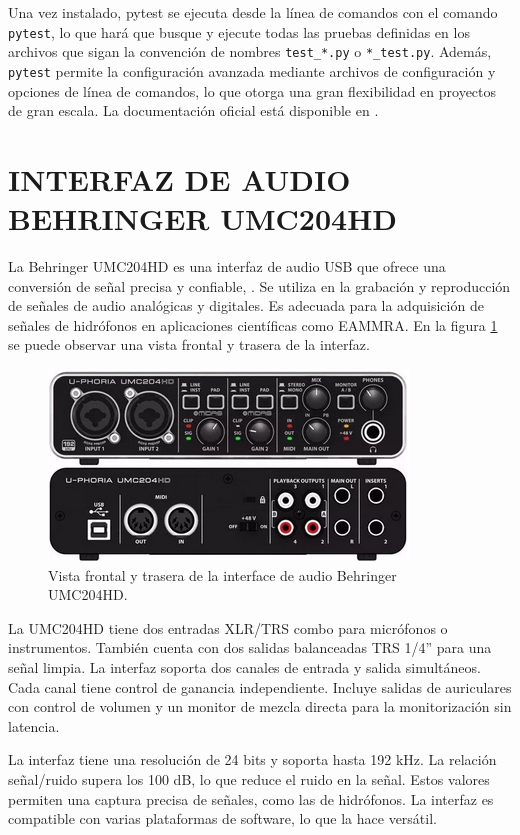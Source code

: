 Una vez instalado, pytest se ejecuta desde la línea de comandos con el comando \texttt{pytest}, lo que hará que busque y ejecute todas las pruebas definidas en los archivos que sigan la convención de nombres \texttt{test\_*.py} o \texttt{*\_test.py}. Además, \texttt{pytest} permite la configuración avanzada mediante archivos de configuración y opciones de línea de comandos, lo que otorga una gran flexibilidad en proyectos de gran escala. La documentación oficial está disponible en \citep{pytest_documentation}.

\clearpage
\section{INTERFAZ DE AUDIO BEHRINGER UMC204HD}

La Behringer UMC204HD es una interfaz de audio USB que ofrece una conversión de señal precisa y confiable, \citep{behringerUMC204HD}. Se utiliza en la grabación y reproducción de señales de audio analógicas y digitales. Es adecuada para la adquisición de señales de hidrófonos en aplicaciones científicas como EAMMRA. En la figura \ref{fig:behringer} se puede observar una vista frontal y trasera de la interfaz.

\vspace{10px}
\begin{figure}[ht]
    \centering
    \includegraphics[width=.5\textwidth]{graficos/behringer.png}
    \caption[]{Vista frontal y trasera de la interface de audio Behringer UMC204HD.}
    \label{fig:behringer}
\end{figure}

La UMC204HD tiene dos entradas XLR/TRS combo para micrófonos o instrumentos. También cuenta con dos salidas balanceadas TRS 1/4” para una señal limpia. La interfaz soporta dos canales de entrada y salida simultáneos. Cada canal tiene control de ganancia independiente. Incluye salidas de auriculares con control de volumen y un monitor de mezcla directa para la monitorización sin latencia.

La interfaz tiene una resolución de 24 bits y soporta hasta 192 kHz. La relación señal/ruido supera los 100 dB, lo que reduce el ruido en la señal. Estos valores permiten una captura precisa de señales, como las de hidrófonos. La interfaz es compatible con varias plataformas de software, lo que la hace versátil.


